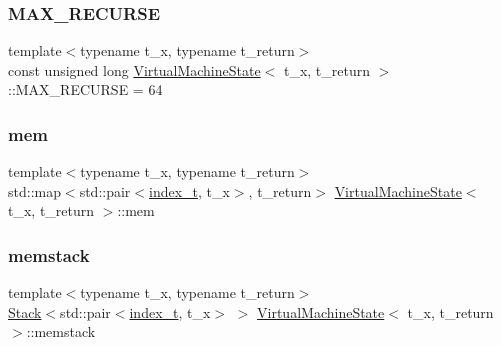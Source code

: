 \subsubsection{\texorpdfstring{M\+A\+X\+\_\+\+R\+E\+C\+U\+R\+SE}{MAX\_RECURSE}}
{\footnotesize\ttfamily template$<$typename t\+\_\+x, typename t\+\_\+return$>$ \\
const unsigned long \hyperlink{class_virtual_machine_state}{Virtual\+Machine\+State}$<$ t\+\_\+x, t\+\_\+return $>$\+::M\+A\+X\+\_\+\+R\+E\+C\+U\+R\+SE = 64\hspace{0.3cm}{\ttfamily [static]}}

\mbox{\label{class_virtual_machine_state_a73a2f267d4140241389b1fcab4a981b0}} 
\subsubsection{\texorpdfstring{mem}{mem}}
{\footnotesize\ttfamily template$<$typename t\+\_\+x, typename t\+\_\+return$>$ \\
std\+::map$<$std\+::pair$<$\hyperlink{class_virtual_machine_state_ad082a1996e3cce1eb04bc788c24a3214}{index\+\_\+t}, t\+\_\+x$>$, t\+\_\+return$>$ \hyperlink{class_virtual_machine_state}{Virtual\+Machine\+State}$<$ t\+\_\+x, t\+\_\+return $>$\+::mem}

\mbox{\label{class_virtual_machine_state_ac7c71aba54fb5fce40ee1854cb5204b6}} 
\subsubsection{\texorpdfstring{memstack}{memstack}}
{\footnotesize\ttfamily template$<$typename t\+\_\+x, typename t\+\_\+return$>$ \\
\hyperlink{class_stack}{Stack}$<$std\+::pair$<$\hyperlink{class_virtual_machine_state_ad082a1996e3cce1eb04bc788c24a3214}{index\+\_\+t}, t\+\_\+x$>$ $>$ \hyperlink{class_virtual_machine_state}{Virtual\+Machine\+State}$<$ t\+\_\+x, t\+\_\+return $>$\+::memstack}

\mbox{\label{class_virtual_machine_state_a37b2fdff8af77aea5b45afb6644099b0}} 
